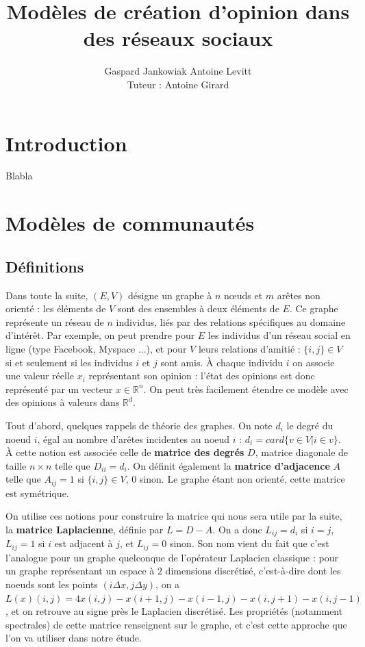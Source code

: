 \documentclass[12pt]{article}
\newcommand{\R}{\mathbb{R}}
\begin{document}
\author{Gaspard Jankowiak \quad Antoine Levitt\\ Tuteur : Antoine Girard}
\title{Modèles de création d'opinion dans des réseaux sociaux}
\maketitle
{}
\tableofcontents
\newpage


\section{Introduction}
Blabla


\section{Modèles de communautés}
\subsection{Définitions}
Dans toute la suite, $(E, V)$ désigne un graphe à $n$ n\oe uds et $m$
arêtes non orienté : les éléments de $V$ sont des ensembles à deux
éléments de $E$. Ce graphe représente un réseau de $n$ individus, liés
par des relations spécifiques au domaine d'intérêt. Par exemple, on
peut prendre pour $E$ les individus d'un réseau social en ligne (type
Facebook, Myspace ...), et pour $V$ leurs relations d'amitié : $\{i,
j\} \in V$ si et seulement si les individus $i$ et $j$ sont amis. À chaque individu
$i$ on associe une valeur réelle $x_i$ représentant son opinion :
l'état des opinions est donc représenté par un vecteur $x \in
\R^n$. On peut très facilement étendre ce modèle avec des opinions à valeurs
dans $\R^d$.

Tout d'abord, quelques rappels de théorie des graphes. On note $d_i$
le degré du noeud $i$, égal au nombre d'arêtes incidentes au noeud
$i$ : $d_i = card \{v \in V | i \in v\}$. À cette notion est
associée celle de {\bf matrice des degrés} $D$, matrice diagonale
de taille $n \times n$ telle que $D_{i i} = d_i$. On définit
également la {\bf matrice d'adjacence} $A$ telle que $A_{i j} = 1$
si $\{i, j\} \in V$, $0$ sinon. Le graphe étant non orienté, cette
matrice est symétrique.

On utilise ces notions pour construire la matrice qui nous sera
utile par la suite, la {\bf matrice Laplacienne}, définie par $L
= D - A$. On a donc $L_{i j} = d_i$ si $i = j$, $L_{i j} = 1$ si
$i$ est adjacent à $j$, et $L_{i j} = 0$ sinon. Son nom vient du
fait que c'est l'analogue pour un graphe quelconque de
l'opérateur Laplacien classique : pour un graphe représentant un
espace à $2$ dimensions discrétisé, c'est-à-dire dont les noeuds
sont les points $(i \Delta x, j \Delta y)$, on a $L(x) (i, j) =
4 x(i, j) - x(i+1, j) - x(i-1, j) - x(i, j+1) - x(i, j-1)$, et
on retrouve au signe près le Laplacien discrétisé. Les
propriétés (notamment spectrales) de cette matrice renseignent
sur le graphe, et c'est cette approche que l'on va utiliser dans
notre étude.
\end{document}
